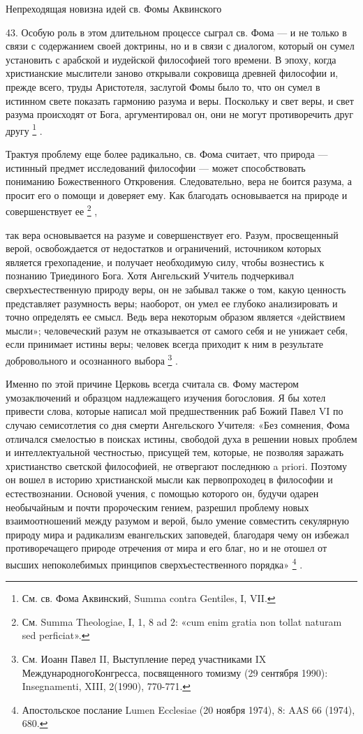 \documentclass[a5paper,10pt]{article}
\begin{document}
Непреходящая новизна идей св. Фомы Аквинского

43. Особую роль в этом длительном процессе сыграл св. Фома — и не только в
связи с содержанием своей доктрины, но и в связи с диалогом, который он сумел
установить с арабской и иудейской философией того времени. В эпоху, когда
христианские мыслители заново открывали сокровища древней философии и, прежде
всего, труды Аристотеля, заслугой Фомы было то, что он сумел в истинном свете
показать гармонию разума и веры. Поскольку и свет веры, и свет разума
происходят от Бога, аргументировал он, они не могут противоречить друг другу
\footnote{См. св. Фома Аквинский, Summa contra Gentiles, I, VII.} .

Трактуя проблему еще более радикально, св. Фома считает, что природа — истинный
предмет исследований философии — может способствовать пониманию Божественного
Откровения. Следовательно, вера не боится разума, а просит его о помощи и
доверяет ему. Как благодать основывается на природе и совершенствует ее
\footnote{См. Summa Theologiae, I, 1, 8 ad 2: «cum enim gratia non tollat
naturam sed perficiat».}  ,

так вера основывается на разуме и совершенствует его. Разум, просвещенный
верой, освобождается от недостатков и ограничений, источником которых является
грехопадение, и получает необходимую силу, чтобы вознестись к познанию
Триединого Бога. Хотя Ангельский Учитель подчеркивал сверхъестественную природу
веры, он не забывал также о том, какую ценность представляет разумность веры;
наоборот, он умел ее глубоко анализировать и точно определять ее смысл. Ведь
вера некоторым образом является «действием мысли»; человеческий разум не
отказывается от самого себя и не унижает себя, если принимает истины веры;
человек всегда приходит к ним в результате добровольного и осознанного выбора
\footnote{См. Иоанн Павел II, Выступление перед участниками IX
МеждународногоКонгресса, посвященного томизму (29 сентября 1990): Insegnamenti,
XIII, 2(1990), 770-771.} .

Именно по этой причине Церковь всегда считала св. Фому мастером умозаключений и
образцом надлежащего изучения богословия. Я бы хотел привести слова, которые
написал мой предшественник раб Божий Павел VI по случаю семисотлетия со дня
смерти Ангельского Учителя: «Без сомнения, Фома отличался смелостью в поисках
истины, свободой духа в решении новых проблем и интеллектуальной честностью,
присущей тем, которые, не позволяя заражать христианство светской философией,
не отвергают последнюю a priori. Поэтому он вошел в историю христианской мысли
как первопроходец в философии и естествознании. Основой учения, с помощью
которого он, будучи одарен необычайным и почти пророческим гением, разрешил
проблему новых взаимоотношений между разумом и верой, было умение совместить
секулярную природу мира и радикализм евангельских заповедей, благодаря чему он
избежал противоречащего природе отречения от мира и его благ, но и не отошел от
высших непоколебимых принципов сверхъестественного порядка»
\footnote{Апостольское послание Lumen Ecclesiae (20 ноября 1974), 8: AAS 66
(1974), 680.}  .
\end{document}
